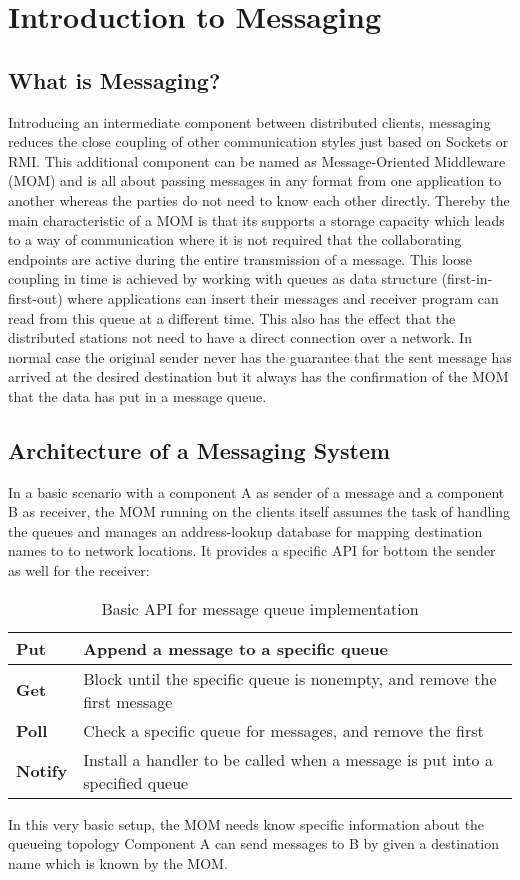\chapter{Introduction to Messaging} 
\section{What is Messaging?} 
Introducing an intermediate component between distributed
clients, messaging reduces the close coupling of other communication styles just
based on Sockets or RMI. This additional component can be named as
Message-Oriented Middleware (MOM) and is all about passing messages in any
format from one application to another whereas the parties do not need to know
each other directly. Thereby the main characteristic of a MOM is that its
supports a storage capacity which leads to a way of communication where it is
not required that the collaborating endpoints are active during the entire
transmission of a message. This loose coupling in time is achieved by
working with queues as data structure (first-in-first-out) where applications
can insert their messages and receiver program can read from this queue at a
different time. This also has the effect that the distributed stations not need
to have a direct connection over a network. In normal case the original sender
never has the guarantee that the sent message has arrived at the desired
destination but it always has the confirmation of the MOM that the data has put
in a message queue. \cite{PprIBMIntro} \cite{TAN06}


\section{Architecture of a Messaging System}
In a basic scenario with a component A as sender of a message and a component B as
receiver, the MOM running on the clients itself assumes the task of handling the
queues and manages an address-lookup database for mapping destination names to
to network locations. It provides a specific API for bottom the sender as well
for the receiver:
\begin{table}[H]
\begin{tabular}{|l|l|}
\hline
\textbf{Put}    & Append a message to a specific queue                                        \\ \hline
\textbf{Get}    & Block until the specific queue is nonempty, and remove the first message    \\ \hline
\textbf{Poll}   & Check a specific queue for messages, and remove the first                   \\ \hline
\textbf{Notify} & Install a handler to be called when a message is put into a specified queue \\ \hline
\end{tabular}
\caption[TAN06]{Basic API for message queue implementation \cite{TAN06}}
\end{table}
In this very basic setup, the MOM needs know specific information about the
queueing topology Component A can send messages to B by
given a destination name which is known by the MOM.

